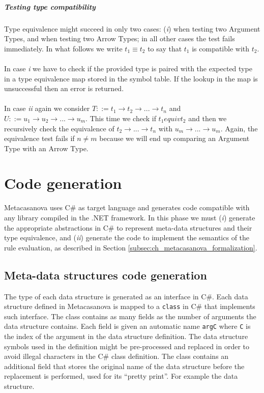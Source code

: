 \subparagraph{Testing type compatibility}

Type equivalence might succeed in only two cases: (\textit{i}) when testing two Argument Types, and when testing two Arrow Types; in all other cases the test fails immediately. In what follows we write $t_1 \equiv t_2$ to say that $t_1$ is compatible with $t_2$.\\\\
In case \textit{i} we have to check if the provided type is paired with the expected type in a type equivalence map stored in the symbol table. If the lookup in the map is unsuccessful then an error is returned.\\\\
In case \textit{ii} again we consider $T ::= t_1 \rightarrow t_2 \rightarrow ... \rightarrow t_n$ and $U ::= u_1 \rightarrow u_2 \rightarrow ... \rightarrow u_m$. This time we check if $t_1 equiv t_2$ and then we recursively check the equivalence of $t_2 \rightarrow ... \rightarrow t_n$ with $u_m \rightarrow ... \rightarrow u_m$. Again, the equivalence test fails if $n \neq m$ because we will end up comparing an Argument Type with an Arrow Type.

\section{Code generation}
\label{sec:ch_metacasanova_code_generation}
Metacasanova uses C\# as target language and generates code compatible with any library compiled in the .NET framework. In this phase we must (\textit{i}) generate the appropriate abstractions in C\# to represent meta-data structures and their type equivalence, and (\textit{ii}) generate the code to implement the semantics of the rule evaluation, as described in Section \ref{subsec:ch_metacasanova_formalization}.

\subsection{Meta-data structures code generation}
The type of each data structure is generated as an interface in C\#. Each data structure defined in Metacasanova is mapped to a \texttt{class} in C\# that implements such interface. The class contains as many fields as the number of arguments the data structure contains. Each field is given an automatic name \texttt{argC} where \texttt{C} is the index of the argument in the data structure definition. The data structure symbols used in the definition might be pre-processed and replaced in order to avoid illegal characters in the C\# class definition. The class contains an additional field that stores the original name of the data structure before the replacement is performed, used for its ``pretty print''. For example the data structure.

